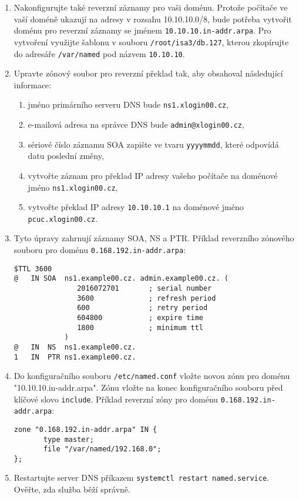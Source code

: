 \documentclass[a4paper,11pt]{article}
\begin{document}
\begin{enumerate}
  \item Nakonfigurujte také reverzní záznamy pro vaši doménu. Protože počítače ve vaší doméně ukazují na adresy v rozsahu 10.10.10.0/8, bude potřeba vytvořit doménu pro reverzní záznamy se jménem \texttt{10.10.10.in-addr.arpa}. Pro vytvoření využijte šablonu v souboru {\tt /root/isa3/db.127}, kterou zkopírujte do adresáře {\tt /var/named} pod názvem {\tt 10.10.10}.
  \item Upravte zónový soubor pro reverzní překlad tak, aby obsahoval následující informace:
    \begin{enumerate}
      \item jméno primárního serveru DNS bude {\tt ns1.xlogin00.cz}, 
      \item e-mailová adresa na správce DNS bude {\tt admin@xlogin00.cz},
      \item sériové číslo záznamu SOA zapište ve tvaru {\tt yyyymmdd}, které odpovídá datu poslední změny,
      \item vytvořte záznam pro překlad IP adresy vašeho počítače na doménové jméno {\tt ns1.xlogin00.cz},
      \item vytvořte překlad IP adresy {\tt 10.10.10.1} na doménové jméno {\tt pcuc.xlogin00.cz}.
    \end{enumerate}
  \item Tyto úpravy zahrnují záznamy SOA, NS a PTR. Příklad reverzního zónového souboru pro doménu {\tt 0.168.192.in-addr.arpa}:
    \vspace{-3mm}
\begin{verbatim}
$TTL 3600
@   IN SOA  ns1.example00.cz. admin.example00.cz. (
               2016072701       ; serial number
               3600             ; refresh period
               600              ; retry period
               604800           ; expire time
               1800             ; minimum ttl
            )
@   IN  NS  ns1.example00.cz.
1   IN  PTR ns1.example00.cz.
\end{verbatim}
  \enlargethispage{2mm}
\item Do konfiguračního souboru {\tt /etc/named.conf} vložte novou zónu pro doménu "10.10.10.in-addr.arpa". Zónu vložte na konec konfiguračního souboru před klíčové slovo {\tt include}. Příklad reverzní zóny pro doménu {\tt 0.168.192.in-addr.arpa}:
\begin{verbatim}
zone "0.168.192.in-addr.arpa" IN {
       type master;
       file "/var/named/192.168.0";
};
\end{verbatim}

  
  \item Restartujte server DNS příkazem {\tt systemctl restart named.service}. Ověřte, zda služba běží správně. 


\end{enumerate}
\end{document}
